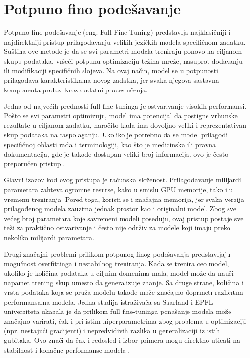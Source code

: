 \documentclass[12pt,oneside]{memoir}
\begin{document}
\section {Potpuno fino podešavanje}
Potpuno fino podešavanje (eng. Full Fine Tuning) predstavlja najklasičniji i najdirektniji pristup prilagođavanju velikih jezičkih modela specifičnom zadatku. Suština ove metode je da se svi parametri modela treniraju ponovo na ciljanom skupu podataka, vršeći potpunu optimizaciju težina mreže, nasuprot dodavanju ili modifikaciji specifičnih slojeva. Na ovaj način, model se u potpunosti prilagođava karakteristikama novog zadatka, jer svaka njegova sastavna komponenta prolazi kroz dodatni proces učenja\cite{radford2019language}.

Jedna od najvećih prednosti full fine-tuninga je ostvarivanje visokih performansi. Pošto se svi parametri optimizuju, model ima potencijal da postigne vrhunske rezultate u ciljanom zadatku, naročito kada ima dovoljno veliki i reprezentativan skup podataka na raspolaganju. Ukoliko je potrebno da se model prilagodi specifičnoj oblasti rada i terminologiji, kao što je medicinska ili pravna dokumentacija, gde je takođe dostupan veliki broj informacija, ovo je često preporučen pristup \cite{christophe2024med42evaluatingfinetuning}. 

Glavni izazov kod ovog pristupa je računska složenost. Prilagođavanje milijardi parametara zahteva ogromne resurse, kako u smislu GPU memorije, tako i u vremenu treniranja. Pored toga, koristi se i značajna memorija, jer svaka verzija prilagođenog modela zauzima jednak prostor kao i originalni model. Zbog sve većeg broj parametara koje savremeni modeli poseduju, ovaj pristup postaje sve teži za praktično ostvarivanje i često nije održiv za modele koji imaju preko nekoliko milijardi parametara. 

Drugi značajni problemi prilikom potpunog finog podešavanja predstavljaju mogućnost overfittinga i nestabilnog treniranja. Kada se trenira ceo model, ukoliko je količina podataka u ciljnim domenima mala, model može da nauči napamet trening skup umesto da generalizuje znanje. Sa druge strane, količina i vrsta podataka koja se pruža modelu takođe može značajno doprineti različitim performansama modela. Jedna studija istraživača sa Saarland i EPFL univerziteta ukazala je da prilikom full fine-tuninga ponašanje modela može značajno varirati, čak i pri istim hiperparametrima zbog problema u optimizaciji (npr. nestajući gradijenti) i nepredvidivih razlika u generalizaciji iz istih gubitaka. Ovo znači da čak i redosled i izbor primera mogu direktno uticati na stabilnost i konačne performanse modela \cite{mosbach2021stabilityfinetuningbert}.
\end{document}
